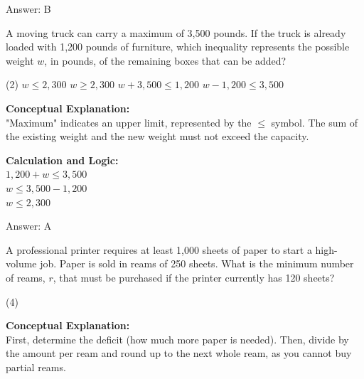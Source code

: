 \documentclass[11pt,paper=a4,answers]{exam}
\begin{document}
\begin{questions}
\begin{solution}
\vspace{15pt}
Answer: \colorbox{yellow!100}{B}
\end{solution}

\vspace{20pt}

\question
A moving truck can carry a maximum of 3,500 pounds. If the truck is already loaded with 1,200 pounds of furniture, which inequality represents the possible weight $w$, in pounds, of the remaining boxes that can be added?
\begin{tasks}(2)
    \task $w \le 2,300$
    \task $w \ge 2,300$
    \task $w + 3,500 \le 1,200$
    \task $w - 1,200 \le 3,500$
\end{tasks}

\begin{solution}
\textbf{Conceptual Explanation:} \\
"Maximum" indicates an upper limit, represented by the $\le$ symbol. The sum of the existing weight and the new weight must not exceed the capacity.

\vspace{10pt}
\textbf{Calculation and Logic:} \\
$1,200 + w \le 3,500$ \\
$w \le 3,500 - 1,200$ \\
$w \le 2,300$

\vspace{15pt}
Answer: \colorbox{yellow!100}{A}
\end{solution}

\vspace{20pt}

\question
A professional printer requires at least 1,000 sheets of paper to start a high-volume job. Paper is sold in reams of 250 sheets. What is the minimum number of reams, $r$, that must be purchased if the printer currently has 120 sheets?
\begin{tasks}(4)
\end{tasks}

\begin{solution}
\textbf{Conceptual Explanation:} \\
First, determine the deficit (how much more paper is needed). Then, divide by the amount per ream and round up to the next whole ream, as you cannot buy partial reams.


\end{solution}
\end{questions}
\end{document}

